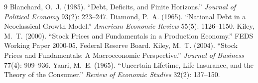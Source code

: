 \documentclass[11pt]{article}
\begin{document}
\begin{thebibliography}{9}
Blanchard, O.~J. (1985). ``Debt, Deficits, and Finite Horizons.'' \emph{Journal of Political Economy} 93(2): 223--247.
Diamond, P.~A. (1965). ``National Debt in a Neoclassical Growth Model.'' \emph{American Economic Review} 55(5): 1126--1150.
Kiley, M.~T. (2000). ``Stock Prices and Fundamentals in a Production Economy.''
FEDS Working Paper 2000-05, Federal Reserve Board.
Kiley, M.~T. (2004). ``Stock Prices and Fundamentals: A Macroeconomic Perspective.''
\emph{Journal of Business} 77(4): 909--936.
Yaari, M.~E. (1965). ``Uncertain Lifetime, Life Insurance, and the Theory of the Consumer.''
\emph{Review of Economic Studies} 32(2): 137--150.
\end{thebibliography}
\end{document}
